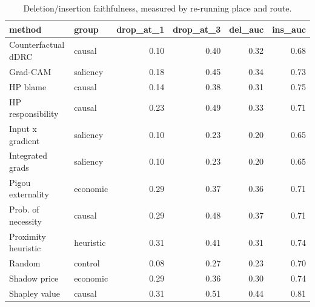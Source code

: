 \begin{table}
\caption{Deletion/insertion faithfulness, measured by re-running place and route.}
\label{tab:faithfulness}
\begin{tabular}{llrrrr}
\toprule
method & group & drop_at_1 & drop_at_3 & del_auc & ins_auc \\
\midrule
Counterfactual dDRC & causal & 0.10 & 0.40 & 0.32 & 0.68 \\
Grad-CAM & saliency & 0.18 & 0.45 & 0.34 & 0.73 \\
HP blame & causal & 0.14 & 0.38 & 0.31 & 0.75 \\
HP responsibility & causal & 0.23 & 0.49 & 0.33 & 0.71 \\
Input x gradient & saliency & 0.10 & 0.23 & 0.20 & 0.65 \\
Integrated grads & saliency & 0.10 & 0.23 & 0.20 & 0.65 \\
Pigou externality & economic & 0.29 & 0.37 & 0.36 & 0.71 \\
Prob. of necessity & causal & 0.29 & 0.48 & 0.37 & 0.71 \\
Proximity heuristic & heuristic & 0.31 & 0.41 & 0.31 & 0.74 \\
Random & control & 0.08 & 0.27 & 0.23 & 0.70 \\
Shadow price & economic & 0.29 & 0.36 & 0.30 & 0.74 \\
Shapley value & causal & 0.31 & 0.51 & 0.44 & 0.81 \\
\bottomrule
\end{tabular}
\end{table}
